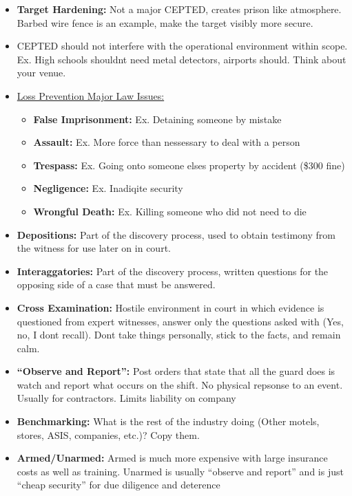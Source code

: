 \documentclass[12pt]{article}
\begin{document}
\begin{itemize}
		  \item \textbf{Target Hardening:} Not a major CEPTED, creates prison like atmosphere. Barbed
					 wire fence is an example, make the target visibly more secure.
		  \item CEPTED should not interfere with the operational environment within scope. Ex. 
					 High schools shouldnt need metal detectors, airports should. Think about your
					 venue.
		  \item \underline{Loss Prevention Major Law Issues:}
					 \begin{itemize}
								\item \textbf{False Imprisonment:} Ex. Detaining someone by mistake
								\item \textbf{Assault:} Ex. More force than nessessary to deal with a person
								\item \textbf{Trespass:} Ex. Going onto someone elses property by accident (\$300 fine)
								\item \textbf{Negligence:} Ex. Inadiqite security
								\item \textbf{Wrongful Death:} Ex. Killing someone who did not need to die
					 \end{itemize}
		  \item \textbf{Depositions:} Part of the discovery process, used to obtain testimony from the witness
		  		for use later on in court. 
		  \item \textbf{Interaggatories:} Part of the discovery process, written questions for the opposing
		  			side of a case that must be answered.
		  \item \textbf{Cross Examination:} Hostile environment in court in which evidence is questioned from
					 expert witnesses, answer only the questions asked with (Yes, no, I dont recall). Dont
					 take things personally, stick to the facts, and remain calm.
		  \item \textbf{``Observe and Report'':} Post orders that state that all the guard does is 
					 watch and report what occurs on the shift. No physical repsonse to an event. Usually
					 for contractors. Limits liability on company
		  \item \textbf{Benchmarking:} What is the rest of the industry doing (Other motels,
					 stores, ASIS, companies, etc.)? Copy them.
		  \item \textbf{Armed/Unarmed:} Armed is much more expensive with large insurance costs as well
					 as training. Unarmed is usually ``observe and report'' and is just ``cheap security''
					 for due diligence and deterence
\end{itemize}
\end{document}
